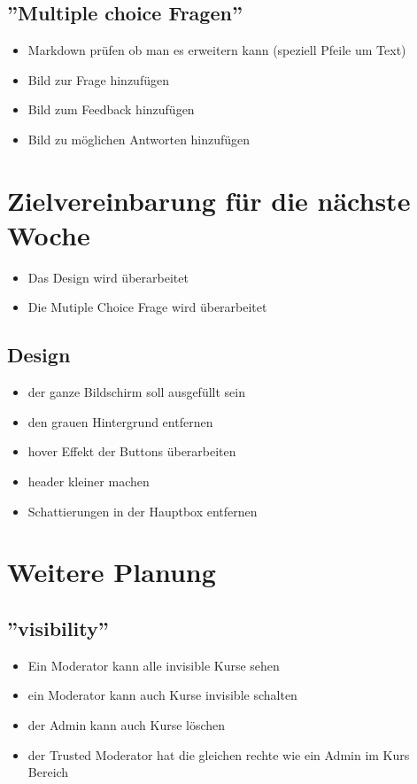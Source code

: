 \documentclass[colorback, accentcolor=tud1c, paper=a4]{tudexercise}
\begin{document}
\begin{multicols}{2}
\subsection{''Multiple choice Fragen''}
\begin{itemize}
	\item Markdown prüfen ob man es erweitern kann (speziell Pfeile um Text)
	\item Bild zur Frage hinzufügen
	\item Bild zum Feedback hinzufügen
	\item Bild zu möglichen Antworten hinzufügen
\end{itemize}

\section{Zielvereinbarung für die nächste Woche}
\begin{itemize}
	\item Das Design wird überarbeitet
	\item Die Mutiple Choice Frage wird überarbeitet
\end{itemize}

	\subsection{Design}
\begin{itemize}
	\item der ganze Bildschirm soll ausgefüllt sein
	\item den grauen Hintergrund entfernen
	\item hover Effekt der Buttons überarbeiten
	\item header kleiner machen
	\item Schattierungen in der Hauptbox entfernen
\end{itemize}

\section{Weitere Planung}
\subsection{''visibility''}
\begin{itemize}
	\item Ein Moderator kann alle invisible Kurse sehen
	\item ein Moderator kann auch Kurse invisible schalten
	\item der Admin kann auch Kurse löschen
	\item der Trusted Moderator hat die gleichen rechte wie ein Admin im Kurs Bereich
\end{itemize}


\end{multicols}
\end{document}

